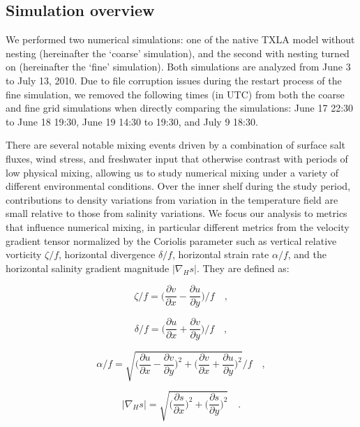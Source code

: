 \documentclass[draft]{agujournal2019}
\begin{document}
\subsection{Simulation overview}

We performed two numerical simulations: one of the native TXLA model without nesting (hereinafter the `coarse' simulation), and the second with nesting turned on (hereinafter the `fine' simulation). Both simulations are analyzed from June 3 to July 13, 2010. Due to file corruption issues during the restart process of the fine simulation, we removed the following times (in UTC) from both the coarse and fine grid simulations when directly comparing the simulations: June 17 22:30 to June 18 19:30, June 19 14:30 to 19:30, and July 9 18:30. 

There are several notable mixing events driven by a combination of surface salt fluxes, wind stress, and freshwater input that otherwise contrast with periods of low physical mixing, allowing us to study numerical mixing under a variety of different environmental conditions. Over the inner shelf during the study period, contributions to density variations from variation in the temperature field are small relative to those from salinity variations. We focus our analysis to metrics that influence numerical mixing, in particular different metrics from the velocity gradient tensor normalized by the Coriolis parameter such as vertical relative vorticity $\zeta/f$, horizontal divergence $\delta/f$, horizontal strain rate $\alpha/f$, and the horizontal salinity gradient magnitude $|\nabla_H s|$. They are defined as:
\begin{linenomath*}
\begin{equation}
    \zeta/f = \bigg(\frac{\partial v}{\partial x} - \frac{\partial u}{\partial y}\bigg)/f \quad ,
\end{equation}
\end{linenomath*}
\begin{linenomath*}
\begin{equation}
    \delta/f = \bigg(\frac{\partial u}{\partial x} + \frac{\partial v}{\partial y}\bigg)/f \quad ,
\end{equation}
\end{linenomath*}
\begin{linenomath*}
\begin{equation}
    \alpha/f = \sqrt{\bigg(\frac{\partial u}{\partial x} - \frac{\partial v}{\partial y}\bigg)^2+\bigg(\frac{\partial v}{\partial x} + \frac{\partial u}{\partial y}\bigg)^2}/f \quad ,
\end{equation}
\end{linenomath*}
\begin{linenomath*}
\begin{equation}
    |\nabla_H s| = \sqrt{\bigg(\frac{\partial s}{\partial x} \bigg) ^2 + \bigg(\frac{\partial s}{\partial y} \bigg)^2} \quad .
\end{equation}
\end{linenomath*}
\end{document}
